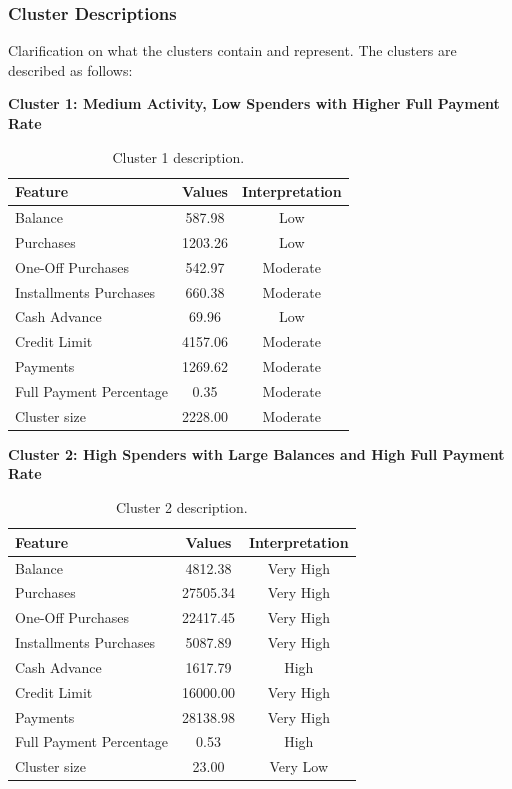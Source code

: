 \subsubsection{Cluster Descriptions}
Clarification on what the clusters contain and represent. The clusters are described as follows:
\vspace{0.3cm}
\par
\begin{center}
\textbf{Cluster 1: Medium Activity, Low Spenders with Higher Full Payment Rate}
\begin{table}[H]
\centering
\begin{tabular}{|l|c|c|}
\hline
\textbf{Feature} & \textbf{Values} & \textbf{Interpretation} \\ \hline
Balance & 587.98 & Low \\ \hline
Purchases & 1203.26 & Low \\ \hline
One-Off Purchases & 542.97 & Moderate \\ \hline
Installments Purchases & 660.38 & Moderate \\ \hline
Cash Advance & 69.96 & Low \\ \hline
Credit Limit & 4157.06 & Moderate \\ \hline
Payments & 1269.62 & Moderate \\ \hline
Full Payment Percentage & 0.35 & Moderate \\ \hline
Cluster size & 2228.00 & Moderate \\ \hline
\end{tabular}
\caption{Cluster 1 description.}
\end{table}

\centering
\textbf{Cluster 2: High Spenders with Large Balances and High Full Payment Rate}
\begin{table}[H]
\centering
\begin{tabular}{|l|c|c|}
\hline
\textbf{Feature} & \textbf{Values} & \textbf{Interpretation} \\ \hline
Balance & 4812.38 & Very High \\ \hline
Purchases & 27505.34 & Very High \\ \hline
One-Off Purchases & 22417.45 & Very High \\ \hline
Installments Purchases & 5087.89 & Very High \\ \hline
Cash Advance & 1617.79 & High \\ \hline
Credit Limit & 16000.00 & Very High \\ \hline
Payments & 28138.98 & Very High \\ \hline
Full Payment Percentage & 0.53 & High \\ \hline
Cluster size & 23.00 & Very Low \\ \hline
\end{tabular}
\caption{Cluster 2 description.}
\end{table}


\end{center}
